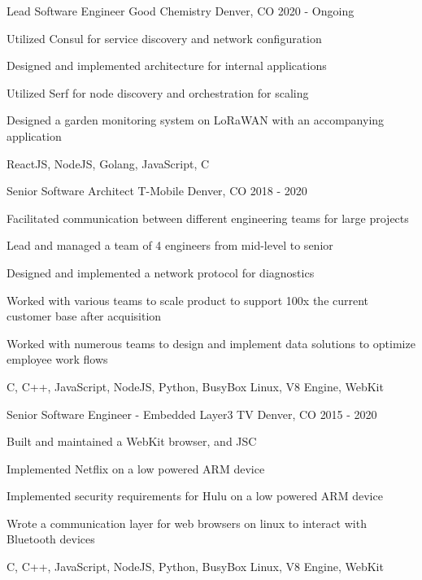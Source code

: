 \begin{cventries}
  \cventry
    {Lead Software Engineer}
    {Good Chemistry}
    {Denver, CO}
    {2020 - Ongoing}
    {
      \begin{cvitems}
        \item {Utilized Consul for service discovery and network configuration}
        \item {Designed and implemented architecture for internal applications}
        \item {Utilized Serf for node discovery and orchestration for scaling}
        \item {Designed a garden monitoring system on LoRaWAN with an accompanying application}
        \item {ReactJS, NodeJS, Golang, JavaScript, C}
      \end{cvitems}
    }
  \cventry
    {Senior Software Architect}
    {T-Mobile}
    {Denver, CO}
    {2018 - 2020}
    {
      \begin{cvitems}
        \item {Facilitated communication between different engineering teams for large projects}
        \item {Lead and managed a team of 4 engineers from mid-level to senior}
        \item {Designed and implemented a network protocol for diagnostics}
        \item {Worked with various teams to scale product to support 100x the current customer base after acquisition}
        \item {Worked with numerous teams to design and implement data solutions to optimize employee work flows}
        \item {C, C++, JavaScript, NodeJS, Python, BusyBox Linux, V8 Engine, WebKit}
      \end{cvitems}
    }
  \cventry
    {Senior Software Engineer - Embedded}
    {Layer3 TV}
    {Denver, CO}
    {2015 - 2020}
    {
      \begin{cvitems}
        \item {Built and maintained a WebKit browser, and JSC}
        \item {Implemented Netflix on a low powered ARM device}
        \item {Implemented security requirements for Hulu on a low powered ARM device}
        \item {Wrote a communication layer for web browsers on linux to interact with Bluetooth devices}
        \item {C, C++, JavaScript, NodeJS, Python, BusyBox Linux, V8 Engine, WebKit}

\end{cvitems}}
\end{cventries}
